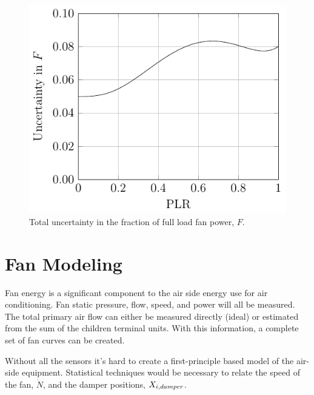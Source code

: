 \begin{figure}
\centering
\includegraphics[options]{Plots/2017-05-15-totalFFLPUncertainty.pdf}
\caption{Total uncertainty in the fraction of full load fan power, \(F\).}
\label{fig:TotalFFLRUncertainty}
\end{figure}





\section{Fan Modeling}\label{sec:FanModeling}

Fan energy is a significant component to the air side energy use for air
conditioning. Fan static pressure, flow, speed, and power will all be
measured.  The total primary air flow can either be measured directly
(ideal) or estimated from the sum of the children terminal units. With
this information, a complete set of fan curves can be created.

Without all the sensors it's hard to create a first-principle based model
of the air-side equipment. Statistical techniques would be necessary to relate
the speed of the fan, \(\dot N\), and the damper positions,
\(X_{i,damper}\).

